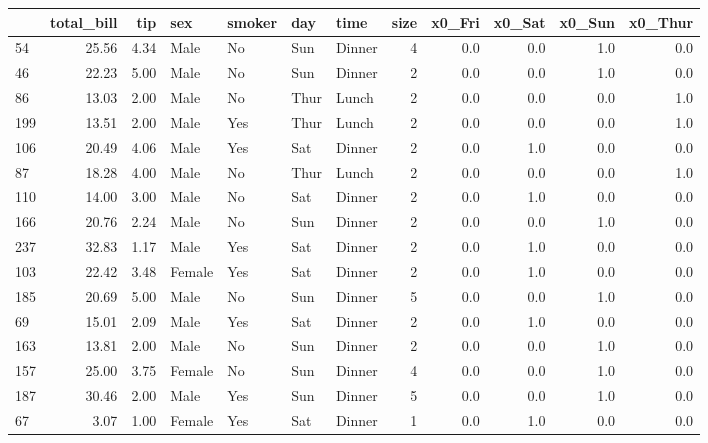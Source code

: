 \documentclass[
  letterpaper,
  DIV=11,
  numbers=noendperiod]{scrreprt}
\begin{document}
\begin{tabular}{lrrllllrrrrr}
\toprule
{} &  total\_bill &   tip &     sex & smoker &   day &    time &  size &  x0\_Fri &  x0\_Sat &  x0\_Sun &  x0\_Thur \\
\midrule
54  &       25.56 &  4.34 &    Male &     No &   Sun &  Dinner &     4 &     0.0 &     0.0 &     1.0 &      0.0 \\
46  &       22.23 &  5.00 &    Male &     No &   Sun &  Dinner &     2 &     0.0 &     0.0 &     1.0 &      0.0 \\
86  &       13.03 &  2.00 &    Male &     No &  Thur &   Lunch &     2 &     0.0 &     0.0 &     0.0 &      1.0 \\
199 &       13.51 &  2.00 &    Male &    Yes &  Thur &   Lunch &     2 &     0.0 &     0.0 &     0.0 &      1.0 \\
106 &       20.49 &  4.06 &    Male &    Yes &   Sat &  Dinner &     2 &     0.0 &     1.0 &     0.0 &      0.0 \\
87  &       18.28 &  4.00 &    Male &     No &  Thur &   Lunch &     2 &     0.0 &     0.0 &     0.0 &      1.0 \\
110 &       14.00 &  3.00 &    Male &     No &   Sat &  Dinner &     2 &     0.0 &     1.0 &     0.0 &      0.0 \\
166 &       20.76 &  2.24 &    Male &     No &   Sun &  Dinner &     2 &     0.0 &     0.0 &     1.0 &      0.0 \\
237 &       32.83 &  1.17 &    Male &    Yes &   Sat &  Dinner &     2 &     0.0 &     1.0 &     0.0 &      0.0 \\
103 &       22.42 &  3.48 &  Female &    Yes &   Sat &  Dinner &     2 &     0.0 &     1.0 &     0.0 &      0.0 \\
185 &       20.69 &  5.00 &    Male &     No &   Sun &  Dinner &     5 &     0.0 &     0.0 &     1.0 &      0.0 \\
69  &       15.01 &  2.09 &    Male &    Yes &   Sat &  Dinner &     2 &     0.0 &     1.0 &     0.0 &      0.0 \\
163 &       13.81 &  2.00 &    Male &     No &   Sun &  Dinner &     2 &     0.0 &     0.0 &     1.0 &      0.0 \\
157 &       25.00 &  3.75 &  Female &     No &   Sun &  Dinner &     4 &     0.0 &     0.0 &     1.0 &      0.0 \\
187 &       30.46 &  2.00 &    Male &    Yes &   Sun &  Dinner &     5 &     0.0 &     0.0 &     1.0 &      0.0 \\
67  &        3.07 &  1.00 &  Female &    Yes &   Sat &  Dinner &     1 &     0.0 &     1.0 &     0.0 &      0.0 \\

\end{tabular}
\end{document}
